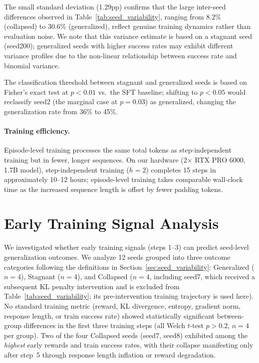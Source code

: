 The small standard deviation (1.29pp) confirms that the large inter-seed differences observed in Table~\ref{tab:seed_variability}, ranging from 8.2\% (collapsed) to 30.6\% (generalized), reflect genuine training dynamics rather than evaluation noise. We note that this variance estimate is based on a stagnant seed (seed200); generalized seeds with higher success rates may exhibit different variance profiles due to the non-linear relationship between success rate and binomial variance.

The classification threshold between stagnant and generalized seeds is based on Fisher's exact test at $p < 0.01$ vs.\ the SFT baseline; shifting to $p < 0.05$ would reclassify seed2 (the marginal case at $p = 0.03$) as generalized, changing the generalization rate from 36\% to 45\%.

\paragraph{Training efficiency.} Episode-level training processes the same total tokens as step-independent training but in fewer, longer sequences. On our hardware (2$\times$ RTX PRO 6000, 1.7B model), step-independent training ($h{=}2$) completes 15 steps in approximately 10--12 hours; episode-level training takes comparable wall-clock time as the increased sequence length is offset by fewer padding tokens.

\section{Early Training Signal Analysis}
\label{app:early_signal}

We investigated whether early training signals (steps 1--3) can predict seed-level generalization outcomes. We analyze 12 seeds grouped into three outcome categories following the definitions in Section~\ref{sec:seed_variability}: Generalized ($n{=}4$), Stagnant ($n{=}4$), and Collapsed ($n{=}4$, including seed7, which received a subsequent KL penalty intervention and is excluded from Table~\ref{tab:seed_variability}; its pre-intervention training trajectory is used here). No standard training metric (reward, KL divergence, entropy, gradient norm, response length, or train success rate) showed statistically significant between-group differences in the first three training steps (all Welch $t$-test $p > 0.2$, $n = 4$ per group). Two of the four Collapsed seeds (seed7, seed8) exhibited among the \textit{highest} early rewards and train success rates, with their collapse manifesting only after step~5 through response length inflation or reward degradation.

